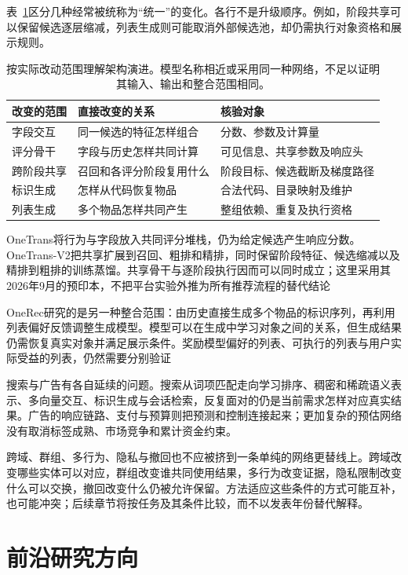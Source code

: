 表~\ref{tab:rs-change-scope}区分几种经常被统称为“统一”的变化。各行不是升级顺序。例如，阶段共享可以保留候选逐层缩减，列表生成则可能取消外部候选池，却仍需执行对象资格和展示规则。

\begin{table}[htbp]
  \centering
  \begin{tabularx}{\linewidth}{@{}lXX@{}}
    \toprule
    改变的范围 & 直接改变的关系 & 核验对象 \\
    \midrule
    字段交互 & 同一候选的特征怎样组合 & 分数、参数及计算量 \\
    评分骨干 & 字段与历史怎样共同计算 & 可见信息、共享参数及响应头 \\
    跨阶段共享 & 召回和各评分阶段复用什么 & 阶段目标、候选截断及梯度路径 \\
    标识生成 & 怎样从代码恢复物品 & 合法代码、目录映射及维护 \\
    列表生成 & 多个物品怎样共同产生 & 整组依赖、重复及执行资格 \\
    \bottomrule
  \end{tabularx}
  \caption{按实际改动范围理解架构演进。模型名称相近或采用同一种网络，不足以证明其输入、输出和整合范围相同。}
  \label{tab:rs-change-scope}
\end{table}

OneTrans将行为与字段放入共同评分堆栈，仍为给定候选产生响应分数。OneTrans-V2把共享扩展到召回、粗排和精排，同时保留阶段特征、候选缩减以及精排到粗排的训练蒸馏。共享骨干与逐阶段执行因而可以同时成立；这里采用其2026年9月的预印本，不把平台实验外推为所有推荐流程的替代结论

OneRec研究的是另一种整合范围：由历史直接生成多个物品的标识序列，再利用列表偏好反馈调整生成模型。模型可以在生成中学习对象之间的关系，但生成结果仍需恢复真实对象并满足展示条件。奖励模型偏好的列表、可执行的列表与用户实际受益的列表，仍然需要分别验证

搜索与广告有各自延续的问题。搜索从词项匹配走向学习排序、稠密和稀疏语义表示、多向量交互、标识生成与会话检索，反复面对的仍是当前需求怎样对应真实结果。广告的响应链路、支付与预算则把预测和控制连接起来；更加复杂的预估网络没有取消标签成熟、市场竞争和累计资金约束。

跨域、群组、多行为、隐私与撤回也不应被挤到一条单纯的网络更替线上。跨域改变哪些实体可以对应，群组改变谁共同使用结果，多行为改变证据，隐私限制改变什么可以交换，撤回改变什么仍被允许保留。方法适应这些条件的方式可能互补，也可能冲突；后续章节将按任务及其条件比较，而不以发表年份替代解释。

\section{前沿研究方向}
\label{sec:rs-frontiers}

